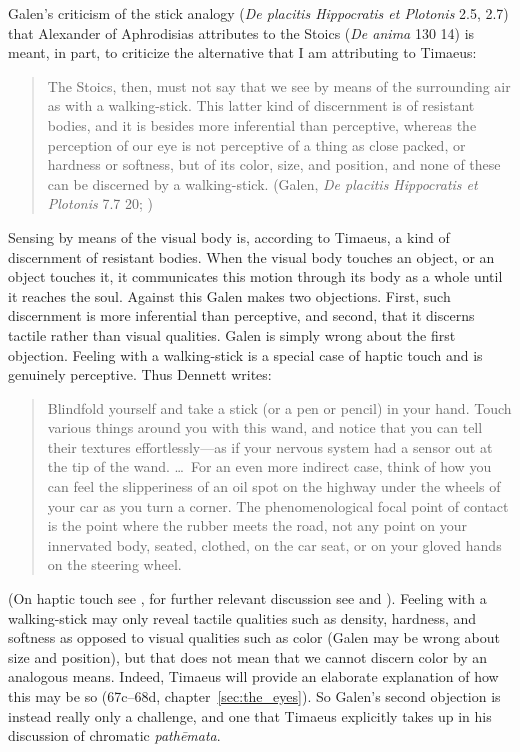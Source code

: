 Galen's criticism of the stick analogy (\emph{De placitis Hippocratis et Plotonis} 2.5, 2.7) that Alexander of Aphrodisias attributes to the Stoics (\emph{De anima} 130 14) is meant, in part, to criticize the alternative that I am attributing to Timaeus:
\begin{quote}
	The Stoics, then, must not say that we see by means of the surrounding air as with a walking-stick. This latter kind of discernment is of resistant bodies, and it is besides more inferential than perceptive, whereas the perception of our eye is not perceptive of a thing as close packed, or hardness or softness, but of its color, size, and position, and none of these can be discerned by a walking-stick. (Galen, \emph{De placitis Hippocratis et Plotonis} 7.7 20; \citealt[475]{Lacy:1980mk})
\end{quote}
Sensing by means of the visual body is, according to Timaeus, a kind of discernment of resistant bodies. When the visual body touches an object, or an object touches it, it communicates this motion through its body as a whole until it reaches the soul. Against this Galen makes two objections. First, such discernment is more inferential than perceptive, and second, that it discerns tactile rather than visual qualities. Galen is simply wrong about the first objection. Feeling with a walking-stick is a special case of haptic touch and is genuinely perceptive. Thus Dennett writes:
\begin{quote}
	Blindfold yourself and take a stick (or a pen or pencil) in your hand. Touch various things around you with this wand, and notice that you can tell their textures effortlessly---as if your nervous system had a sensor out at the tip of the wand. \ldots\ For an even more indirect case, think of how you can feel the slipperiness of an oil spot on the highway under the wheels of your car as you turn a corner. The phenomenological focal point of contact is the point where the rubber meets the road, not any point on your innervated body, seated, clothed, on the car seat, or on your gloved hands on the steering wheel. \citep[47]{Dennett:1993ce}
\end{quote}
(On haptic touch see \citealt{Lederman:1987fr}, for further relevant discussion see \citealt{Fulkerson:2014ek} and \citealt[chapters 1--2]{Kalderon:2018oe}). Feeling with a walking-stick may only reveal tactile qualities such as density, hardness, and softness as opposed to visual qualities such as color (Galen may be wrong about size and position), but that does not mean that we cannot discern color by an analogous means. Indeed, Timaeus will provide an elaborate explanation of how this may be so (67c–68d, chapter~\ref{sec:the_eyes}). So Galen's second objection is instead really only a challenge, and one that Timaeus explicitly takes up in his discussion of chromatic \emph{pathēmata}.

